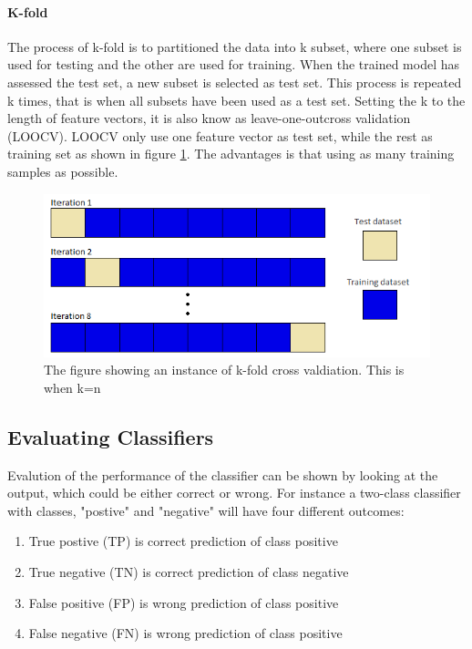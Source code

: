 \documentclass[USenglish]{ifimaster}  %
\begin{document}
\paragraph{K-fold}
The process of k-fold is to partitioned the data into k subset, where one subset is used for testing and the other are used for training. When the trained model has assessed the test set, a new subset is selected as test set. This process is repeated k times, that is when all subsets have been used as a test set. Setting the k to the length of feature vectors, it is also know as leave-one-outcross validation (LOOCV). LOOCV only use one feature vector as test set, while the rest as training set as shown in figure \ref{fig:kfold}. The advantages is that using as many training samples as possible.


\begin{figure}[h]
    \centering
    \includegraphics[scale=0.6]{Figures/Kfold}
    \caption{The figure showing an instance of k-fold cross valdiation. This is when k=n}
    \label{fig:kfold}
\end{figure}



\subsection{Evaluating Classifiers}
\label{subsec:evalclf}
Evalution of the performance of the classifier can be shown by looking at the output, which could be either correct or wrong. For instance a two-class classifier with classes, "postive" and "negative" will have four different outcomes:

\begin{enumerate}
\item True postive (TP) is correct prediction of class positive
\item True negative (TN) is correct prediction of class negative
\item False positive (FP) is wrong prediction of class positive
\item False negative (FN) is wrong prediction of class positive
\end{enumerate}
\end{document}
